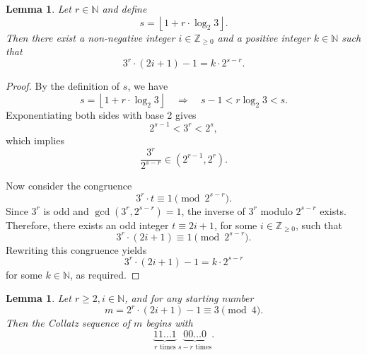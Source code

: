 \documentclass{amsart}
\newtheorem{lemma}[theorem]{Lemma}
\theoremstyle{definition}
\theoremstyle{remark}
\numberwithin{equation}{section}
\begin{document}
\begin{lemma}\label{lem:length}
	Let \( r \in \mathbb{N} \) and define
	\[
	s = \left\lfloor 1 + r \cdot \log_2 3 \right\rfloor.
	\]
	Then there exist a non-negative integer \( i \in \mathbb{Z}_{\geq 0} \) and a positive integer \( k \in \mathbb{N} \) such that
	\[
	3^{r} \cdot (2i+1) - 1 = k \cdot 2^{s - r}.
	\]
\end{lemma}

\begin{proof}
	By the definition of \( s \), we have
	\[
	s = \left\lfloor 1 + r \cdot \log_2 3 \right\rfloor \quad \Rightarrow \quad s - 1 < r \log_2 3 < s.
	\]
	Exponentiating both sides with base 2 gives
	\[
	2^{s - 1} < 3^r < 2^s,
	\]
	which implies
	\[
	\frac{3^r}{2^{s - r}} \in \left(2^{r - 1}, 2^r\right).
	\]
	
	Now consider the congruence
	\[
	3^r \cdot t \equiv 1 \pmod{2^{s - r}}.
	\]
	Since \( 3^r \) is odd and \( \gcd(3^r, 2^{s - r}) = 1 \), the inverse of \( 3^r \) modulo \( 2^{s - r} \) exists. Therefore, there exists an odd integer \( t \equiv 2i + 1 \), for some \( i \in \mathbb{Z}_{\geq 0} \), such that
	\[
	3^r \cdot (2i + 1) \equiv 1 \pmod{2^{s - r}}.
	\]
	Rewriting this congruence yields
	\[
	3^r \cdot (2i + 1) - 1 = k \cdot 2^{s - r}
	\]
	for some \( k \in \mathbb{N} \), as required.
\end{proof}


\begin{lemma}\label{lem:min}
	Let \( r\geq2, i \in \mathbb{N} \), and for any starting number 
	\[
	m = 2^r \cdot (2i+1) - 1 \equiv 3\pmod{4}.
	\]
	Then the Collatz sequence of \( m \) begins with
	\[
	\underbrace{11\ldots1}_{r \text{ times}}\,\underbrace{00\ldots0}_{s - r \text{ times}}.
	\]
\end{lemma}
\end{document}

